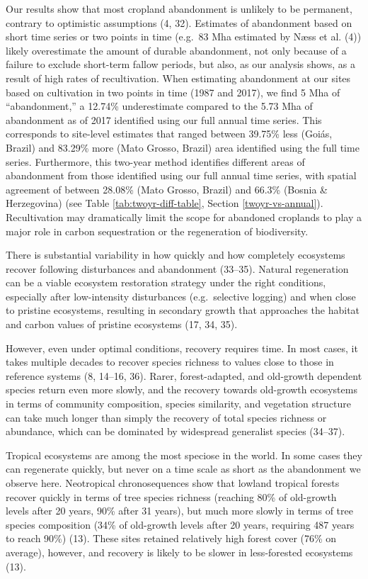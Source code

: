 \documentclass[9pt,twocolumn,twoside,]{pnas-new}
\begin{document}
Our results show that most cropland abandonment is unlikely to be permanent, contrary to optimistic assumptions (4, 32).
Estimates of abandonment based on short time series or two points in time (e.g.~83 Mha estimated by Næss et al. (4)) likely overestimate the amount of durable abandonment, not only because of a failure to exclude short-term fallow periods, but also, as our analysis shows, as a result of high rates of recultivation.
When estimating abandonment at our sites based on cultivation in two points in time (1987 and 2017), we find 5 Mha of ``abandonment,'' a 12.74\% underestimate compared to the 5.73 Mha of abandonment as of 2017 identified using our full annual time series.
This corresponds to site-level estimates that ranged between 39.75\% less (Goiás, Brazil) and 83.29\% more (Mato Grosso, Brazil) area identified using the full time series.
Furthermore, this two-year method identifies different areas of abandonment from those identified using our full annual time series, with spatial agreement of between 28.08\% (Mato Grosso, Brazil) and 66.3\% (Bosnia \& Herzegovina) (see Table \ref{tab:twoyr-diff-table}, Section \ref{twoyr-vs-annual}).
Recultivation may dramatically limit the scope for abandoned croplands to play a major role in carbon sequestration or the regeneration of biodiversity.

There is substantial variability in how quickly and how completely ecosystems recover following disturbances and abandonment (33--35).
Natural regeneration can be a viable ecosystem restoration strategy under the right conditions, especially after low-intensity disturbances (e.g.~selective logging) and when close to pristine ecosystems, resulting in secondary growth that approaches the habitat and carbon values of pristine ecosystems (17, 34, 35).

However, even under optimal conditions, recovery requires time.
In most cases, it takes multiple decades to recover species richness to values close to those in reference systems (8, 14--16, 36).
Rarer, forest-adapted, and old-growth dependent species return even more slowly, and the recovery towards old-growth ecosystems in terms of community composition, species similarity, and vegetation structure can take much longer than simply the recovery of total species richness or abundance, which can be dominated by widespread generalist species (34--37).

Tropical ecosystems are among the most speciose in the world.
In some cases they can regenerate quickly, but never on a time scale as short as the abandonment we observe here.
Neotropical chronosequences show that lowland tropical forests recover quickly in terms of tree species richness (reaching 80\% of old-growth levels after 20 years, 90\% after 31 years), but much more slowly in terms of tree species composition (34\% of old-growth levels after 20 years, requiring 487 years to reach 90\%) (13).
These sites retained relatively high forest cover (76\% on average), however, and recovery is likely to be slower in less-forested ecosystems (13).
\end{document}
